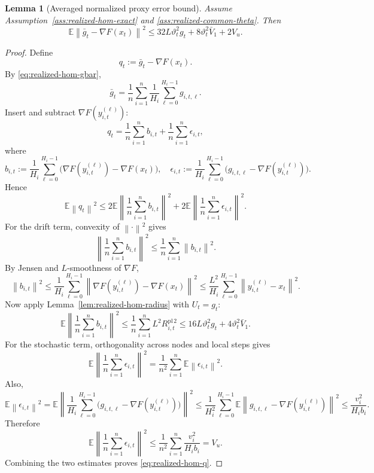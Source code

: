 \documentclass{article}
\newtheorem{lemma}[theorem]{Lemma}
\theoremstyle{definition}
\newcommand{\EE}{\mathbb E}
\newcommand{\norm}[1]{\left\lVert #1\right\rVert}
\begin{document}
\begin{lemma}[Averaged normalized proxy error bound]
\label{lem:realized-hom-q}
Assume Assumption~\ref{ass:realized-hom-exact} and \ref{ass:realized-common-theta}. Then
\begin{equation}
\EE\norm{\bar g_t-\nabla F(x_t)}^2
\le
32L\vartheta_t^2 g_t
+
8\vartheta_t^2\bar V_1
+
2V_u.
\label{eq:realized-hom-q}\end{equation}
\end{lemma}

\begin{proof}
Define
\[
q_t:=\bar g_t-\nabla F(x_t).
\]
By \eqref{eq:realized-hom-gbar},
\[
\bar g_t
=
\frac1n\sum_{i=1}^n \frac1{H_i}\sum_{\ell=0}^{H_i-1} g_{i,t,\ell}.
\]
Insert and subtract $\nabla F(y_{i,t}^{(\ell)})$:
\[
q_t
=
\frac1n\sum_{i=1}^n b_{i,t}
+
\frac1n\sum_{i=1}^n \epsilon_{i,t},
\]
where
\[
b_{i,t}
:=
\frac1{H_i}\sum_{\ell=0}^{H_i-1}
\bigl(\nabla F(y_{i,t}^{(\ell)})-\nabla F(x_t)\bigr),\quad\epsilon_{i,t}
:=
\frac1{H_i}\sum_{\ell=0}^{H_i-1}
\bigl(g_{i,t,\ell}-\nabla F(y_{i,t}^{(\ell)})\bigr).
\]
Hence
\[
\EE\norm{q_t}^2
\le
2\EE\left\|
\frac1n\sum_{i=1}^n b_{i,t}
\right\|^2
+
2\EE\left\|
\frac1n\sum_{i=1}^n \epsilon_{i,t}
\right\|^2.
\]
For the drift term, convexity of $\norm{\cdot}^2$ gives
\[
\left\|
\frac1n\sum_{i=1}^n b_{i,t}
\right\|^2
\le
\frac1n\sum_{i=1}^n \norm{b_{i,t}}^2.
\]
By Jensen and $L$-smoothness of $\nabla F$,
\[
\norm{b_{i,t}}^2
\le
\frac1{H_i}\sum_{\ell=0}^{H_i-1}
\norm{\nabla F(y_{i,t}^{(\ell)})-\nabla F(x_t)}^2
\le
\frac{L^2}{H_i}\sum_{\ell=0}^{H_i-1}\norm{y_{i,t}^{(\ell)}-x_t}^2.
\]
Now apply Lemma~\ref{lem:realized-hom-radius} with $U_t=g_t$:
\[
\EE\left\|
\frac1n\sum_{i=1}^n b_{i,t}
\right\|^2
\le
\frac1n\sum_{i=1}^n L^2 R_{i,t}^{\mathrm{pl}\,2}
\le
16L\vartheta_t^2 g_t
+
4\vartheta_t^2\bar V_1.
\]
For the stochastic term, orthogonality across nodes and local steps gives
\[
\EE\left\|
\frac1n\sum_{i=1}^n \epsilon_{i,t}
\right\|^2
=
\frac1{n^2}\sum_{i=1}^n \EE\norm{\epsilon_{i,t}}^2.
\]
Also,
\[
\EE\norm{\epsilon_{i,t}}^2
=
\EE\left\|
\frac1{H_i}\sum_{\ell=0}^{H_i-1}
\bigl(g_{i,t,\ell}-\nabla F(y_{i,t}^{(\ell)})\bigr)
\right\|^2
\le
\frac1{H_i^2}\sum_{\ell=0}^{H_i-1}
\EE\norm{g_{i,t,\ell}-\nabla F(y_{i,t}^{(\ell)})}^2
\le
\frac{v_i^2}{H_i b_i}.
\]
Therefore
\[
\EE\left\|
\frac1n\sum_{i=1}^n \epsilon_{i,t}
\right\|^2
\le
\frac1{n^2}\sum_{i=1}^n \frac{v_i^2}{H_i b_i}
=
V_u.
\]
Combining the two estimates proves \eqref{eq:realized-hom-q}.
\end{proof}
\end{document}
